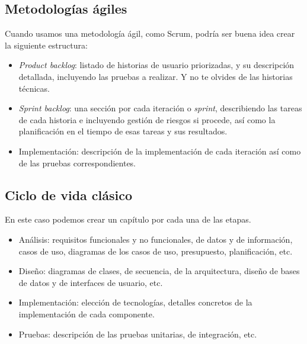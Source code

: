 \subsection{Metodologías ágiles}

Cuando usamos una metodología ágil, como Scrum, podría ser buena idea crear la siguiente estructura:
\begin{itemize}
    \item \textit{Product backlog}: listado de historias de usuario priorizadas, y su descripción detallada, incluyendo las pruebas a realizar. Y no te olvides de las historias técnicas. 
    \item \textit{Sprint backlog}: una sección por cada iteración o \textit{sprint}, describiendo las tareas de cada historia e incluyendo gestión de riesgos si procede, así como la planificación en el tiempo de esas tareas y sus resultados.
    \item Implementación: descripción de la implementación de cada iteración así como de las pruebas correspondientes. 
    
\end{itemize}
            
\subsection{Ciclo de vida clásico}
En este caso podemos crear un capítulo por cada una de las etapas.
                \begin{itemize}
                    \item Análisis: requisitos funcionales y no funcionales, de datos y de información, casos de uso, diagramas de los casos de uso, presupuesto, planificación, etc.
                    \item Diseño: diagramas de clases, de secuencia, de la arquitectura, diseño de bases de datos y de interfaces de usuario, etc.
                    \item Implementación: elección de tecnologías, detalles concretos de la implementación de cada componente.
                    \item Pruebas: descripción de las pruebas unitarias, de integración, etc.
                \end{itemize}

